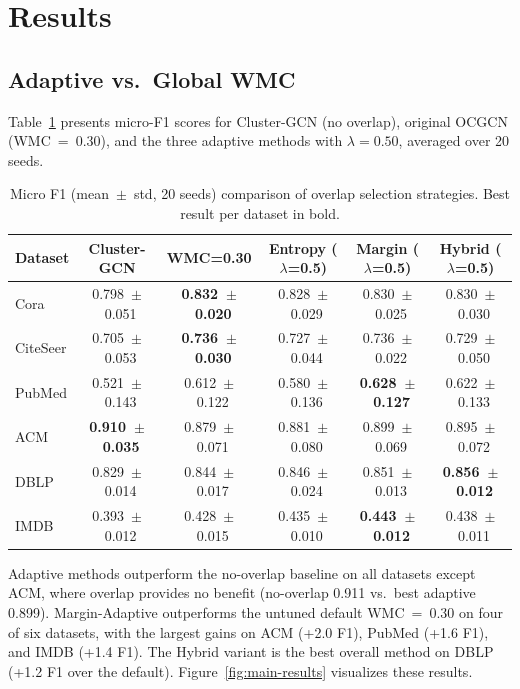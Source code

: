 \documentclass[a4paper,11pt,oneside,onecolumn,preprint]{elsarticle}
\numberwithin{equation}{section}
\begin{document}
\section{Results}
\label{sec:results}

\subsection{Adaptive vs.\ Global WMC}
\label{subsec:adaptive-vs-global}

Table~\ref{tab:main-results} presents micro-F1 scores for Cluster-GCN (no overlap), original OCGCN (WMC~=~0.30), and the three adaptive methods with $\lambda = 0.50$, averaged over 20 seeds.

\begin{table}[ht]
\centering
\caption{Micro F1 (mean~$\pm$~std, 20 seeds) comparison of overlap selection strategies. Best result per dataset in bold.}
\label{tab:main-results}
\begin{tabular}{lccccc}
\toprule
\textbf{Dataset} & \textbf{Cluster-GCN} & \textbf{WMC=0.30} & \textbf{Entropy ($\lambda$=0.5)} & \textbf{Margin ($\lambda$=0.5)} & \textbf{Hybrid ($\lambda$=0.5)} \\
\midrule
Cora      & 0.798~$\pm$~0.051 & \textbf{0.832~$\pm$~0.020} & 0.828~$\pm$~0.029 & 0.830~$\pm$~0.025 & 0.830~$\pm$~0.030 \\
CiteSeer  & 0.705~$\pm$~0.053 & \textbf{0.736~$\pm$~0.030} & 0.727~$\pm$~0.044 & 0.736~$\pm$~0.022 & 0.729~$\pm$~0.050 \\
PubMed    & 0.521~$\pm$~0.143 & 0.612~$\pm$~0.122 & 0.580~$\pm$~0.136 & \textbf{0.628~$\pm$~0.127} & 0.622~$\pm$~0.133 \\
ACM       & \textbf{0.910~$\pm$~0.035} & 0.879~$\pm$~0.071 & 0.881~$\pm$~0.080 & 0.899~$\pm$~0.069 & 0.895~$\pm$~0.072 \\
DBLP      & 0.829~$\pm$~0.014 & 0.844~$\pm$~0.017 & 0.846~$\pm$~0.024 & 0.851~$\pm$~0.013 & \textbf{0.856~$\pm$~0.012} \\
IMDB      & 0.393~$\pm$~0.012 & 0.428~$\pm$~0.015 & 0.435~$\pm$~0.010 & \textbf{0.443~$\pm$~0.012} & 0.438~$\pm$~0.011 \\
\bottomrule
\end{tabular}
\end{table}

Adaptive methods outperform the no-overlap baseline on all datasets except ACM, where overlap provides no benefit (no-overlap 0.911 vs.\ best adaptive 0.899).
Margin-Adaptive outperforms the untuned default WMC~=~0.30 on four of six datasets, with the largest gains on ACM (+2.0 F1), PubMed (+1.6 F1), and IMDB (+1.4 F1).
The Hybrid variant is the best overall method on DBLP (+1.2 F1 over the default).
Figure~\ref{fig:main-results} visualizes these results.
\end{document}
